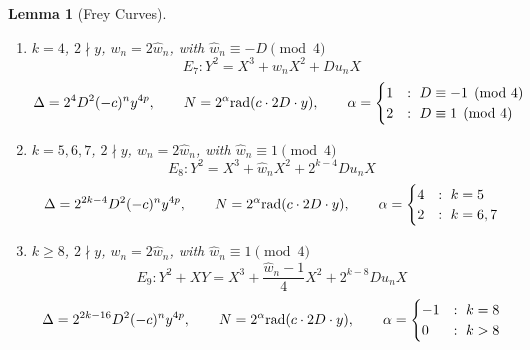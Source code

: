 \documentclass[12pt]{amsart}
\newtheorem{lem}[thm]{Lemma}
\theoremstyle{definition}
\newcommand{\rad}{{\rm{rad}}}
\newcommand{\notdiv}{\nmid}
\begin{document}
\begin{lem}[Frey Curves]
\begin{enumerate}[1.]
\item $k=4$, $2 \notdiv y$, $w_n = 2 \hat{w}_n$,  with $\hat{w}_n \equiv -D \pmod{4}$
\[ E_{7} : Y^2 = X^3 +\hat{w}_nX^2 + D u_n X\]
 \[ \Delta = 2^4D^2(-c)^ny^{4p}, \qquad N = 2^\alpha \rad( c \cdot 2D \cdot y) ,  \qquad \alpha =  \begin{cases} 1 & : \ D \equiv -1 \pmod{4}\\ 2 & : \ D \equiv 1 \pmod{4} \end{cases} \]


\item $k = 5,6,7$, $2 \notdiv y$, $w_n = 2 \hat{w}_n$, with $\hat{w}_n \equiv 1 \pmod{4}$
\[ E_{8} : Y^2 = X^3 + \hat{w}_nX^2 + 2^{k-4}D u_n X \]
\[ \Delta = 2^{2k-4}D^2(-c)^ny^{4p}, \qquad N = 2^\alpha \rad(c \cdot 2D \cdot y ) ,  \qquad \alpha =  \begin{cases} 4 &:  \ k = 5 \\ 2 &:  \ k = 6,7 \end{cases} \]


\item $k\geq 8$, $2 \notdiv y$, $w_n = 2 \hat{w}_n$, with $\hat{w}_n \equiv 1 \pmod{4}$
\[ E_{9} : Y^2 + XY = X^3 + \frac{\hat{w}_n-1}{4} X^2 + 2^{k-8}D u_n X \]
\[ \Delta = 2^{2k-16}D^2(-c)^ny^{4p}, \qquad N = 2^\alpha \rad(c \cdot 2D \cdot y) ,  \qquad \alpha =  \begin{cases} -1&: \ k = 8 \\ 0 &: \ k > 8 \end{cases} \]


\end{enumerate}
\end{lem}
\end{document}
